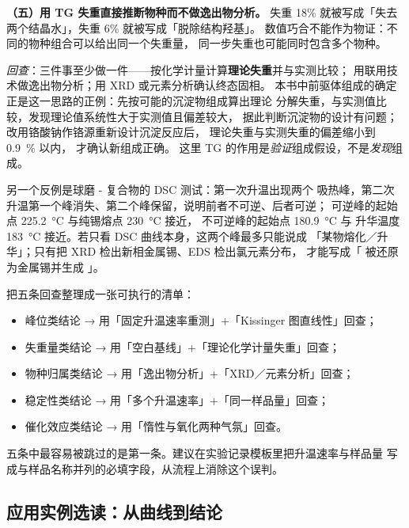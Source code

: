 \begin{pitfall}
\textbf{（五）用 TG 失重直接推断物种而不做逸出物分析。}
失重 18\% 就被写成「失去两个结晶水」，失重 6\% 就被写成「脱除结构羟基」。
数值巧合不能作为物证：不同的物种组合可以给出同一个失重量，
同一步失重也可能同时包含多个物种。

\emph{回查}：三件事至少做一件——按化学计量计算\textbf{理论失重}并与实测比较；
用联用技术做逸出物分析；用 XRD 或元素分析确认终态固相。
本书中前驱体组成的确定正是这一思路的正例：先按可能的沉淀物组成算出理论
分解失重，与实测值比较，发现理论值系统性大于实测值且偏差较大，
据此判断沉淀物的设计有问题；改用铬酸钠作铬源重新设计沉淀反应后，
理论失重与实测失重的偏差缩小到 \qty{0.9}{\percent} 以内，
才确认新组成正确。
这里 TG 的作用是\emph{验证}组成假设，不是\emph{发现}组成。

另一个反例是球磨 - 复合物的 DSC 测试：第一次升温出现两个
吸热峰，第二次升温第一个峰消失、第二个峰保留，说明前者不可逆、后者可逆；
可逆峰的起始点 \qty{225.2}{\celsius} 与纯锡熔点 \qty{230}{\celsius} 接近，
不可逆峰的起始点 \qty{180.9}{\celsius} 与  升华温度
\qty{183}{\celsius} 接近。若只看 DSC 曲线本身，这两个峰最多只能说成
「某物熔化／升华」；只有把 XRD 检出新相金属锡、EDS 检出氯元素分布，
才能写成「 被还原为金属锡并生成 」。
\end{pitfall}

\begin{crosscheck}
把五条回查整理成一张可执行的清单：

\begin{itemize}
  \item 峰位类结论 → 用「固定升温速率重测」+「Kissinger 图直线性」回查；
  \item 失重量类结论 → 用「空白基线」+「理论化学计量失重」回查；
  \item 物种归属类结论 → 用「逸出物分析」+「XRD／元素分析」回查；
  \item 稳定性类结论 → 用「多个升温速率」+「同一样品量」回查；
  \item 催化效应类结论 → 用「惰性与氧化两种气氛」回查。
\end{itemize}

五条中最容易被跳过的是第一条。建议在实验记录模板里把升温速率与样品量
写成与样品名称并列的必填字段，从流程上消除这个误判。
\end{crosscheck}

\subsection{应用实例选读：从曲线到结论}

